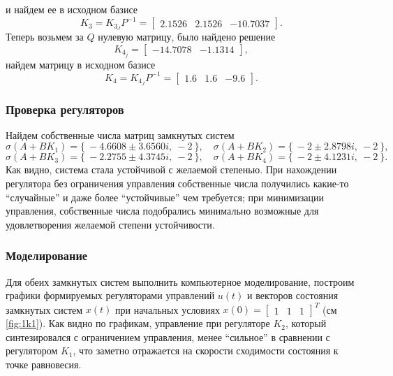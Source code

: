и найдем ее в исходном базисе
\begin{equation*}
    K_3=K_{3_J}P^{-1}=\begin{bmatrix}
        2.1526&2.1526& -10.7037
    \end{bmatrix}.
\end{equation*}
Теперь возьмем за $Q$ нулевую матрицу, было найдено решение
\begin{equation*}
    K_{4_j}=\begin{bmatrix}
        -14.7078& -1.1314
    \end{bmatrix},
\end{equation*}
найдем матрицу в исходном базисе
\begin{equation*}
    K_4=K_{4_J}P^{-1}=\begin{bmatrix}
        1.6&1.6& -9.6
    \end{bmatrix}.
\end{equation*}



\subsubsection{Проверка регуляторов}

Найдем собственные числа матриц замкнутых систем
\begin{equation*}
    \sigma(A+BK_1)=\{\ -4.6608 \pm 3.6560i,\ -2\ \},\quad
    \sigma(A+BK_2)=\{\ -2 \pm 2.8798i,\ -2\ \},
\end{equation*}
\begin{equation*}
    \sigma(A+BK_3)=\{\ -2.2755 \pm 4.3745i,\ -2\ \},\quad
    \sigma(A+BK_4)=\{\ -2 \pm 4.1231i,\ -2\ \}.
\end{equation*}
Как видно, система стала устойчивой с желаемой степенью. При нахождении
регулятора без ограничения управления собственные числа получились какие-то ``случайные''
и даже более ``устойчивые'' чем требуется; при минимизации управления, собственные
числа подобрались минимально возможные для удовлетворения желаемой степени устойчивости.




\subsubsection{Моделирование}

Для обеих замкнутых систем выполнить компьютерное моделирование,
построим графики формируемых регуляторами управлений $u(t)$ и векторов
состояния замкнутых систем $x(t)$ при начальных условиях $x(0) =\begin{bmatrix}
    1&1&1
\end{bmatrix}^T$ (см \autoref{fig:1k1}). Как видно по графикам, управление
при регуляторе $K_2$, который синтезировался с ограничением управления, менее
``сильное'' в сравнении с регулятором $K_1$, что заметно отражается на 
скорости сходимости состояния к точке равновесия.

